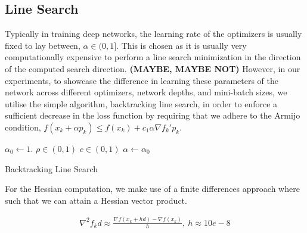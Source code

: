 \documentclass{article}
\begin{document}
\subsection{Line Search}
Typically in training deep networks, the learning rate of the optimizers is usually fixed to lay between, $\alpha \in (0,1]$. This is chosen as it is usually very computationally expensive to perform a line search minimization in the direction of the computed search direction.\textbf{ (MAYBE, MAYBE NOT)} However, in our experiments, to showcase the difference in learning these parameters of the network across different optimizers, network depths, and mini-batch sizes, we utilise the simple algorithm, backtracking line search, in order to enforce a sufficient decrease in the loss function by requiring that we adhere to the Armijo condition,
$
f(x_k + \alpha p_k) \leq f(x_k) + c_1 \alpha \nabla f_k' p_k
$.

\begin{algorithm}[H]
\SetAlgoLined
\KwResult{$\alpha$ }
 $\alpha_0 \gets 1.$\;
 $\rho \in (0,1)$\;
 $c \in (0,1)$\;
 $\alpha \gets \alpha_0$\;
 \caption{Backtracking Line Search}
\end{algorithm}

%
% 
 
 
For the Hessian computation, we make use of a finite differences approach where such that we can attain a Hessian vector product.

\begin{gather*}
\nabla^2 f_k d \approx \frac{\nabla f(x_k + hd) - \nabla f(x_k)}{h},\ h \approx 10e-8
\end{gather*}
\end{document}
